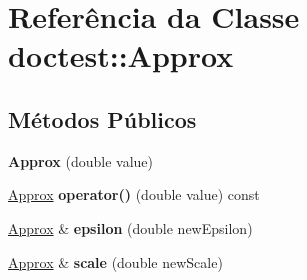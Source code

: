 \hypertarget{classdoctest_1_1Approx}{}\section{Referência da Classe doctest\+:\+:Approx}
\label{classdoctest_1_1Approx}
\subsection*{Métodos Públicos}
\begin{DoxyCompactItemize}
\item 
\mbox{\label{classdoctest_1_1Approx_a86f0d1b44c1cf095697f23ccdab00802}} 
{\bfseries Approx} (double value)
\item 
\mbox{\label{classdoctest_1_1Approx_aae907c5ea1c4ac94e134db9e35da7dce}} 
\hyperlink{classdoctest_1_1Approx}{Approx} {\bfseries operator()} (double value) const
\item 
\mbox{\label{classdoctest_1_1Approx_af8df6b0af00fd875e5b6a0c30b86f636}} 
\hyperlink{classdoctest_1_1Approx}{Approx} \& {\bfseries epsilon} (double new\+Epsilon)
\item 
\mbox{\label{classdoctest_1_1Approx_a62185fd4c09a63dab61bd893574d8473}} 
\hyperlink{classdoctest_1_1Approx}{Approx} \& {\bfseries scale} (double new\+Scale)
\end{DoxyCompactItemize}
